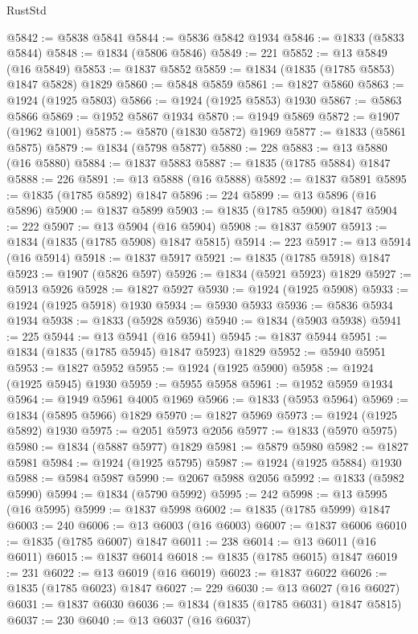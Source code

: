 \begin{lexlean}{RustStd}
\begin{coremodule}
{\begin{coremodule}
{{{{{@5842 := @5838 @5841
@5844 := @5836 @5842 @1934
@5846 := @1833 (@5833 @5844)
@5848 := @1834 (@5806 @5846)
@5849 := 221
@5852 := @13 @5849 (@16 @5849)
@5853 := @1837 @5852
@5859 := @1834 (@1835 (@1785 @5853) @1847 @5828) @1829
@5860 := @5848 @5859
@5861 := @1827 @5860
@5863 := @1924 (@1925 @5803)
@5866 := @1924 (@1925 @5853) @1930
@5867 := @5863 @5866
@5869 := @1952 @5867 @1934
@5870 := @1949 @5869
@5872 := @1907 (@1962 @1001)
@5875 := @5870 (@1830 @5872) @1969
@5877 := @1833 (@5861 @5875)
@5879 := @1834 (@5798 @5877)
@5880 := 228
@5883 := @13 @5880 (@16 @5880)
@5884 := @1837 @5883
@5887 := @1835 (@1785 @5884) @1847
@5888 := 226
@5891 := @13 @5888 (@16 @5888)
@5892 := @1837 @5891
@5895 := @1835 (@1785 @5892) @1847
@5896 := 224
@5899 := @13 @5896 (@16 @5896)
@5900 := @1837 @5899
@5903 := @1835 (@1785 @5900) @1847
@5904 := 222
@5907 := @13 @5904 (@16 @5904)
@5908 := @1837 @5907
@5913 := @1834 (@1835 (@1785 @5908) @1847 @5815)
@5914 := 223
@5917 := @13 @5914 (@16 @5914)
@5918 := @1837 @5917
@5921 := @1835 (@1785 @5918) @1847
@5923 := @1907 (@5826 @597)
@5926 := @1834 (@5921 @5923) @1829
@5927 := @5913 @5926
@5928 := @1827 @5927
@5930 := @1924 (@1925 @5908)
@5933 := @1924 (@1925 @5918) @1930
@5934 := @5930 @5933
@5936 := @5836 @5934 @1934
@5938 := @1833 (@5928 @5936)
@5940 := @1834 (@5903 @5938)
@5941 := 225
@5944 := @13 @5941 (@16 @5941)
@5945 := @1837 @5944
@5951 := @1834 (@1835 (@1785 @5945) @1847 @5923) @1829
@5952 := @5940 @5951
@5953 := @1827 @5952
@5955 := @1924 (@1925 @5900)
@5958 := @1924 (@1925 @5945) @1930
@5959 := @5955 @5958
@5961 := @1952 @5959 @1934
@5964 := @1949 @5961 @4005 @1969
@5966 := @1833 (@5953 @5964)
@5969 := @1834 (@5895 @5966) @1829
@5970 := @1827 @5969
@5973 := @1924 (@1925 @5892) @1930
@5975 := @2051 @5973 @2056
@5977 := @1833 (@5970 @5975)
@5980 := @1834 (@5887 @5977) @1829
@5981 := @5879 @5980
@5982 := @1827 @5981
@5984 := @1924 (@1925 @5795)
@5987 := @1924 (@1925 @5884) @1930
@5988 := @5984 @5987
@5990 := @2067 @5988 @2056
@5992 := @1833 (@5982 @5990)
@5994 := @1834 (@5790 @5992)
@5995 := 242
@5998 := @13 @5995 (@16 @5995)
@5999 := @1837 @5998
@6002 := @1835 (@1785 @5999) @1847
@6003 := 240
@6006 := @13 @6003 (@16 @6003)
@6007 := @1837 @6006
@6010 := @1835 (@1785 @6007) @1847
@6011 := 238
@6014 := @13 @6011 (@16 @6011)
@6015 := @1837 @6014
@6018 := @1835 (@1785 @6015) @1847
@6019 := 231
@6022 := @13 @6019 (@16 @6019)
@6023 := @1837 @6022
@6026 := @1835 (@1785 @6023) @1847
@6027 := 229
@6030 := @13 @6027 (@16 @6027)
@6031 := @1837 @6030
@6036 := @1834 (@1835 (@1785 @6031) @1847 @5815)
@6037 := 230
@6040 := @13 @6037 (@16 @6037)
}}}}}
\end{coremodule}}
\end{coremodule}
\end{lexlean}
